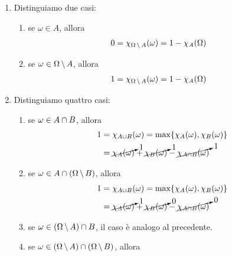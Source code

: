 \documentclass[a4paper]{article}
\begin{document}
\begin{snippetproof}{}
    \begin{enumerate}
        \item Distinguiamo due casi:
            \begin{enumerate}
                \item se \(\omega \in A\), allora
                    \begin{align*}
                        0 &= \chi_{\Omega \,\backslash\, A}(\omega) = 1 - \chi_A(\Omega)
                    \end{align*}
                \item se \(\omega \in \Omega \,\backslash\, A\), allora
                    \begin{align*}
                        1 &= \chi_{\Omega \,\backslash\, A}(\omega) = 1 - \chi_A(\Omega)
                    \end{align*}
            \end{enumerate}
        \item Distinguiamo quattro casi:
            \begin{enumerate}
                \item se \(\omega \in A \cap B\), allora
                    \begin{align*}
                        1 &= \chi_{A \cup B}(\omega) = \max\{\chi_A(\omega), \chi_B(\omega)\} \\
                        &= \cancelto{1}{\chi_A(\omega)} + \cancelto{1}{\chi_B(\omega)} - \cancelto{1}{\chi_{A \cap B}(\omega)}
                    \end{align*}
                \item se \(\omega \in A \cap (\Omega \,\backslash\, B)\), allora
                    \begin{align*}
                        1 &= \chi_{A \cup B}(\omega) = \max\{\chi_A(\omega), \chi_B(\omega)\} \\
                        &= \cancelto{1}{\chi_A(\omega)} + \cancelto{0}{\chi_B(\omega)} - \cancelto{0}{\chi_{A \cap B}(\omega)}
                    \end{align*}
                \item se \(\omega \in (\Omega \,\backslash\, A) \cap B\), il caso è analogo al precedente.
                \item se \(\omega \in (\Omega \,\backslash\, A) \cap (\Omega \,\backslash\, B)\), allora
                    \begin{align*}

\end{align*}
\end{enumerate}
\end{enumerate}
\end{snippetproof}
\end{document}

